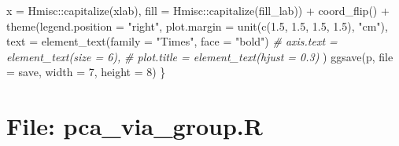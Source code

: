 \documentclass[
]{article}
\newenvironment{Shaded}{\begin{snugshade}}{\end{snugshade}}
\newcommand{\AttributeTok}[1]{\textcolor[rgb]{0.77,0.63,0.00}{#1}}
\newcommand{\CommentTok}[1]{\textcolor[rgb]{0.56,0.35,0.01}{\textit{#1}}}
\newcommand{\DecValTok}[1]{\textcolor[rgb]{0.00,0.00,0.81}{#1}}
\newcommand{\FloatTok}[1]{\textcolor[rgb]{0.00,0.00,0.81}{#1}}
\newcommand{\FunctionTok}[1]{\textcolor[rgb]{0.00,0.00,0.00}{#1}}
\newcommand{\NormalTok}[1]{#1}
\newcommand{\SpecialCharTok}[1]{\textcolor[rgb]{0.00,0.00,0.00}{#1}}
\newcommand{\StringTok}[1]{\textcolor[rgb]{0.31,0.60,0.02}{#1}}
\begin{document}
\begin{Shaded}
\begin{Highlighting}[]
           \AttributeTok{x =}\NormalTok{ Hmisc}\SpecialCharTok{::}\FunctionTok{capitalize}\NormalTok{(xlab),}
           \AttributeTok{fill =}\NormalTok{ Hmisc}\SpecialCharTok{::}\FunctionTok{capitalize}\NormalTok{(fill\_lab)) }\SpecialCharTok{+}
      \FunctionTok{coord\_flip}\NormalTok{() }\SpecialCharTok{+}
      \FunctionTok{theme}\NormalTok{(}\AttributeTok{legend.position =} \StringTok{"right"}\NormalTok{,}
            \AttributeTok{plot.margin =} \FunctionTok{unit}\NormalTok{(}\FunctionTok{c}\NormalTok{(}\FloatTok{1.5}\NormalTok{, }\FloatTok{1.5}\NormalTok{, }\FloatTok{1.5}\NormalTok{, }\FloatTok{1.5}\NormalTok{), }\StringTok{"cm"}\NormalTok{),}
            \AttributeTok{text =} \FunctionTok{element\_text}\NormalTok{(}\AttributeTok{family =} \StringTok{"Times"}\NormalTok{, }\AttributeTok{face =} \StringTok{"bold"}\NormalTok{)}
            \CommentTok{\# axis.text = element\_text(size = 6),}
            \CommentTok{\# plot.title = element\_text(hjust = 0.3)}
\NormalTok{      )}
    \FunctionTok{ggsave}\NormalTok{(p, }\AttributeTok{file =}\NormalTok{ save, }\AttributeTok{width =} \DecValTok{7}\NormalTok{, }\AttributeTok{height =} \DecValTok{8}\NormalTok{)}
\NormalTok{  \}}
\end{Highlighting}
\end{Shaded}

\hypertarget{file-pca_via_group.r}{%
\section{File: pca\_via\_group.R}\label{file-pca_via_group.r}}
\end{document}
